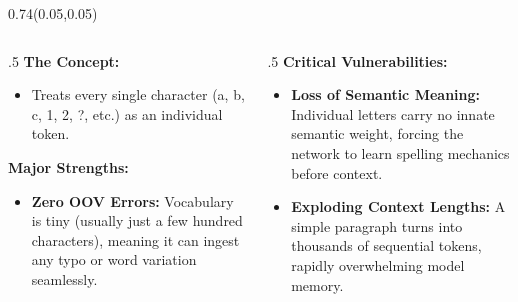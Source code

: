 \documentclass[aspectratio=169]{beamer}
\begin{document}
	\begin{frame}{}
		\setlength{\TPHorizModule}{\textwidth}
		\setlength{\TPVertModule}{\textwidth}
		\begin{textblock}{0.74}(0.05,0.05)
			\bfseries\large{}
		\end{textblock}
		
		\vspace{2em}
		\begin{columns}
			\begin{column}{.5\textwidth}
				\textbf{The Concept:}
				\begin{itemize}
					\item Treats every single character (a, b, c, 1, 2, ?, etc.) as an individual token.
				\end{itemize}
				\vspace{0.5em}
				\textbf{Major Strengths:}
				\begin{itemize}
					\item \textbf{Zero OOV Errors:} Vocabulary is tiny (usually just a few hundred characters), meaning it can ingest any typo or word variation seamlessly.
				\end{itemize}
			\end{column}
			\begin{column}{.5\textwidth}
				\textbf{Critical Vulnerabilities:}
				\begin{itemize}
					\item \textbf{Loss of Semantic Meaning:} Individual letters carry no innate semantic weight, forcing the network to learn spelling mechanics before context.
					\item \textbf{Exploding Context Lengths:} A simple paragraph turns into thousands of sequential tokens, rapidly overwhelming model memory.
				\end{itemize}
			\end{column}
		\end{columns}
	\end{frame}
	
\end{document}
